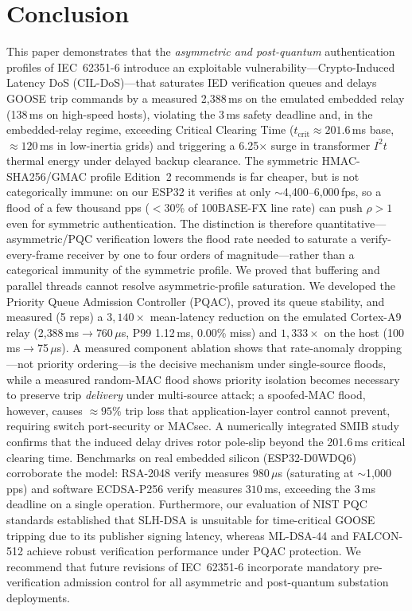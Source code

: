 \documentclass[journal]{IEEEtran}
\begin{document}
\section{Conclusion}
\label{sec:conclusion}
This paper demonstrates that the \emph{asymmetric and post-quantum} authentication profiles of IEC~62351-6 introduce an exploitable vulnerability---Crypto-Induced Latency DoS (CIL-DoS)---that saturates IED verification queues and delays GOOSE trip commands by a measured 2,388\,ms on the emulated embedded relay (138\,ms on high-speed hosts), violating the 3\,ms safety deadline and, in the embedded-relay regime, exceeding Critical Clearing Time ($t_{\text{crit}} \approx 201.6$\,ms base, $\approx 120$\,ms in low-inertia grids) and triggering a 6.25$\times$ surge in transformer $I^2 t$ thermal energy under delayed backup clearance. The symmetric HMAC-SHA256/GMAC profile Edition~2 recommends is far cheaper, but is not categorically immune: on our ESP32 it verifies at only $\sim$4{,}400--6{,}000\,fps, so a flood of a few thousand pps ($<$30\% of 100BASE-FX line rate) can push $\rho>1$ even for symmetric authentication. The distinction is therefore quantitative---asymmetric/PQC verification lowers the flood rate needed to saturate a verify-every-frame receiver by one to four orders of magnitude---rather than a categorical immunity of the symmetric profile. We proved that buffering and parallel threads cannot resolve asymmetric-profile saturation. We developed the Priority Queue Admission Controller (PQAC), proved its queue stability, and measured (5 reps) a $3{,}140\times$ mean-latency reduction on the emulated Cortex-A9 relay (2{,}388\,ms$\to$760\,$\mu$s, P99 1.12\,ms, 0.00\% miss) and $1{,}333\times$ on the host (100\,ms$\to$75\,$\mu$s). A measured component ablation shows that rate-anomaly dropping---not priority ordering---is the decisive mechanism under single-source floods, while a measured random-MAC flood shows priority isolation becomes necessary to preserve trip \emph{delivery} under multi-source attack; a spoofed-MAC flood, however, causes $\approx 95\%$ trip loss that application-layer control cannot prevent, requiring switch port-security or MACsec. A numerically integrated SMIB study confirms that the induced delay drives rotor pole-slip beyond the 201.6\,ms critical clearing time. Benchmarks on real embedded silicon (ESP32-D0WDQ6) corroborate the model: RSA-2048 verify measures $980\,\mu$s (saturating at $\sim$1{,}000\,pps) and software ECDSA-P256 verify measures $310$\,ms, exceeding the 3\,ms deadline on a single operation. Furthermore, our evaluation of NIST PQC standards established that SLH-DSA is unsuitable for time-critical GOOSE tripping due to its publisher signing latency, whereas ML-DSA-44 and FALCON-512 achieve robust verification performance under PQAC protection. We recommend that future revisions of IEC~62351-6 incorporate mandatory pre-verification admission control for all asymmetric and post-quantum substation deployments.



\end{document}

